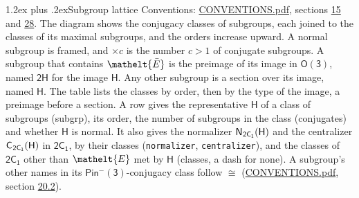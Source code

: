 \documentclass[10pt,a4paper]{article}
\makeatletter
\renewcommand\section{\@startsection{section}{1}{\z@}{-3ex plus -1ex minus -.2ex}%
  {1.2ex plus .2ex}{\normalfont\large\sffamily\bfseries\color{parttitle}}}
\numberwithin{equation}{section}
\newcommand{\eltfont}[1]{{\let\sigma\eltsigma\mathelt{#1}}}
\newcommand{\grp}[1]{\mathsf{#1}}
\newcommand{\cls}[1]{\eltfont{#1}}
\newcommand{\elt}[1]{\eltfont{#1}}
\newcommand{\samecls}{\cong}
\newcommand{\barred}[1]{\bar{#1}}
\newcommand{\hairsp}{\mkern1mu}
\makeatother
\begin{document}
\section{Subgroup lattice}\label{s:subgroups}
Conventions: \href{../../CONVENTIONS.pdf}{CONVENTIONS.pdf}, sections \href{../../../rotation/CONVENTIONS.pdf\#conv.15}{15} and \href{../../CONVENTIONS.pdf\#conv.28}{28}.
The diagram shows the conjugacy classes of subgroups, each joined to the classes of its maximal subgroups, and the orders increase upward. \label{n:index.conjugates.c}A normal subgroup is framed, and ${\times}c$ is the number $c > 1$ of conjugate subgroups. \label{n:group.H}A subgroup that contains $\elt{\barred{E}}$ is the preimage of its image in $\grp{O(3)}$, named $\grp{2H}$ for the image $\grp{H}$. Any other subgroup is a section over its image, named $\grp{H}$. The table lists the classes by order, then by the type of the image, a preimage before a section. \label{n:head.subgroup}\label{n:head.order}\label{n:head.conjugates}\label{n:head.normal}A row gives the representative $\grp{H}$ of a class of subgroups (subgrp), its order, the number of subgroups in the class (conjugates) and whether $\grp{H}$ is normal. \label{n:group.normalizer}\label{n:group.centralizer}\label{n:head.classes}It also gives the normalizer $\grp{N}_{\hairsp \grp{2C_{1}}}(\grp{H})$ and the centralizer $\grp{C}_{\hairsp \grp{2C_{1}}}(\grp{H})$ in $\grp{2C_{1}}$, by their classes (\texttt{normalizer}, \texttt{centralizer}), and the classes of $\grp{2C_{1}}$ other than $\cls{E}$ met by $\grp{H}$ (classes, a dash for none). A subgroup's other names in its \href{Pinminus3.pdf}{$\grp{Pin^{-}(3)}$}-conjugacy class follow $\samecls$ (\href{../../CONVENTIONS.pdf}{CONVENTIONS.pdf}, section \href{../../CONVENTIONS.pdf\#conv.20.2}{20.2}).
\begin{center}
\end{center}
\end{document}
